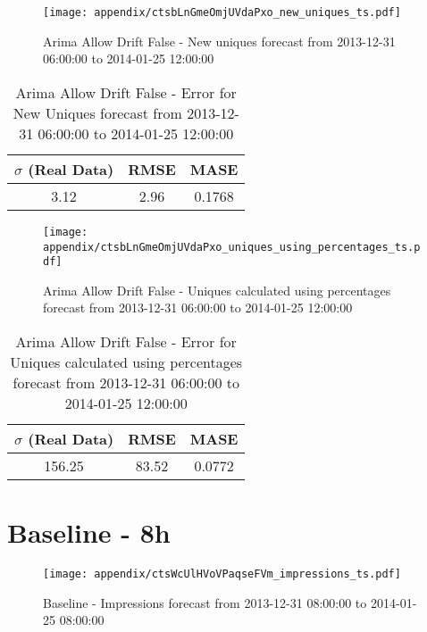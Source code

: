 \begin{figure}[H] \begin{center} \leavevmode
\texttt{[image: appendix/ctsbLnGmeOmjUVdaPxo\_new\_uniques\_ts.pdf]} \caption[]{
Arima Allow Drift False - New uniques forecast from 2013-12-31 06:00:00 to 2014-01-25 12:00:00} \label{fig:appendix/ctsbLnGmeOmjUVdaPxo_new_uniques_ts.pdf} \end{center}
\end{figure}

\begin{table}[H]
\centering
\footnotesize
\begin{tabular}{ccc}
$\sigma$ (Real Data) & RMSE & MASE   \\ \hline
3.12 & 2.96 & 0.1768 \\
\end{tabular}

\vspace{0.5cm}

\caption[]{
Arima Allow Drift False - Error for New Uniques forecast from 2013-12-31 06:00:00 to 2014-01-25 12:00:00}
\end{table}

\begin{figure}[H] \begin{center} \leavevmode
\texttt{[image: appendix/ctsbLnGmeOmjUVdaPxo\_uniques\_using\_percentages\_ts.pdf]} \caption[]{
Arima Allow Drift False - Uniques calculated using percentages forecast from 2013-12-31 06:00:00 to 2014-01-25 12:00:00} \label{fig:appendix/ctsbLnGmeOmjUVdaPxo_uniques_using_percentages_ts.pdf} \end{center}
\end{figure}

\begin{table}[H]
\centering
\footnotesize
\begin{tabular}{ccc}
$\sigma$ (Real Data) & RMSE & MASE   \\ \hline
156.25 & 83.52 & 0.0772 \\
\end{tabular}

\vspace{0.5cm}

\caption[]{
Arima Allow Drift False - Error for Uniques calculated using percentages forecast from 2013-12-31 06:00:00 to 2014-01-25 12:00:00}
\end{table}

\section{Baseline - 8h}
\begin{figure}[H] \begin{center} \leavevmode
\texttt{[image: appendix/ctsWcUlHVoVPaqseFVm\_impressions\_ts.pdf]} \caption[]{
Baseline - Impressions forecast from 2013-12-31 08:00:00 to 2014-01-25 08:00:00} \label{fig:appendix/ctsWcUlHVoVPaqseFVm_impressions_ts.pdf} \end{center}
\end{figure}

